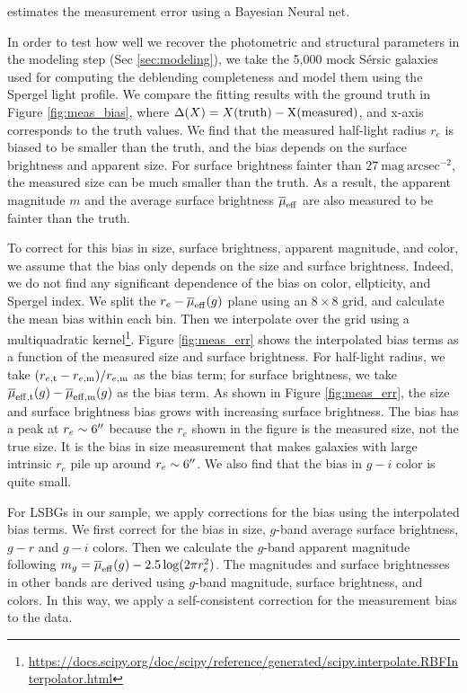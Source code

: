 \documentclass[twocolumn,astrosymb,twocolappendix]{aastex631}
\newcommand{\sbunit}{\mathrm{mag\ arcsec}^{-2}}
\newcommand{\sersic}{S\'ersic}
\begin{document}
\begin{CJK*}{UTF8}{gbsn}
\citet{Tanoglidis2022ICML} estimates the measurement error using a Bayesian Neural net. 

In order to test how well we recover the photometric and structural parameters in the modeling step (Sec \ref{sec:modeling}), we take the 5,000 mock \sersic{} galaxies used for computing the deblending completeness and model them using the Spergel light profile. We compare the fitting results with the ground truth in Figure \ref{fig:meas_bias}, where $\Delta(X) = X(\rm truth) - X(\rm measured)$, and x-axis corresponds to the truth values. We find that the measured half-light radius $r_e$ is biased to be smaller than the truth, and the bias depends on the surface brightness and apparent size. For surface brightness fainter than $27\ \sbunit$, the measured size can be much smaller than the truth. As a result, the apparent magnitude $m$ and the average surface brightness $\overline{\mu}_{\rm eff}$ are also measured to be fainter than the truth. 

To correct for this bias in size, surface brightness, apparent magnitude, and color, we assume that the bias only depends on the size and surface brightness. Indeed, we do not find any significant dependence of the bias on color, ellpticity, and Spergel index. We split the $r_e-\overline{\mu}_{\rm eff}(g)$ plane using an $8\times 8$ grid, and calculate the mean bias within each bin. Then we interpolate over the grid using a multiquadratic kernel\footnote{\url{https://docs.scipy.org/doc/scipy/reference/generated/scipy.interpolate.RBFInterpolator.html}}. Figure \ref{fig:meas_err} shows the interpolated bias terms as a function of the measured size and surface brightness. For half-light radius, we take $(r_{e, \rm t} - r_{e, \rm m}) / r_{e,\rm m}$ as the bias term; for surface brightness, we take $\overline{\mu}_{\rm eff, t}(g) - \overline{\mu}_{\rm eff, m}(g)$ as the bias term. As shown in Figure \ref{fig:meas_err}, the size and surface brightness bias grows with increasing surface brightness. The bias has a peak at $r_e\sim 6\mbox{$^{\prime\prime}$}$ because the $r_e$ shown in the figure is the measured size, not the true size. It is the bias in size measurement that makes galaxies with large intrinsic $r_e$ pile up around $r_e\sim 6\mbox{$^{\prime\prime}$}$. We also find that the bias in $g-i$ color is quite small. 

For LSBGs in our sample, we apply corrections for the bias using the interpolated bias terms. We first correct for the bias in size, $g$-band average surface brightness, $g-r$ and $g-i$ colors. Then we calculate the $g$-band apparent magnitude following $m_g = \overline{\mu}_{\rm eff}(g) - 2.5\log(2\pi r_e^2)$. The magnitudes and surface brightnesses in other bands are derived using $g$-band magnitude, surface brightness, and colors. In this way, we apply a self-consistent correction for the measurement bias to the data. 


\end{CJK*}
\end{document}
